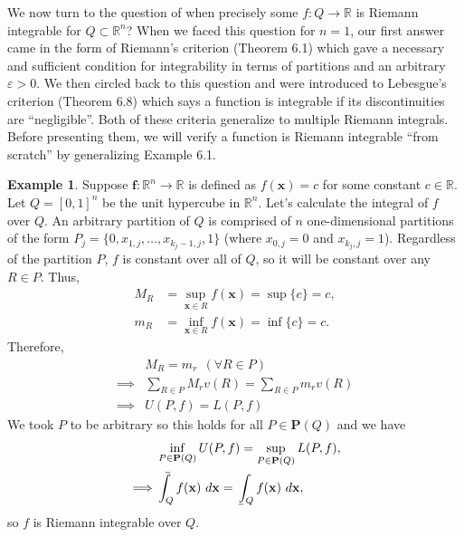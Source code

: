 \documentclass{article}
\def\upint{\mathchoice%
	{\mkern13mu\overline{\vphantom{\intop}\mkern7mu}\mkern-20mu}%
	{\mkern7mu\overline{\vphantom{\intop}\mkern7mu}\mkern-14mu}%
	{\mkern7mu\overline{\vphantom{\intop}\mkern7mu}\mkern-14mu}%
	{\mkern7mu\overline{\vphantom{\intop}\mkern7mu}\mkern-14mu}%
	\int}
\def\lowint{\mkern3mu\underline{\vphantom{\intop}\mkern7mu}\mkern-10mu\int}
\newcommand{\R}{\mathbb{R}}
\newcommand{\x}{\mathbf{x}}
\newcommand{\f}{\mathbf{f}}
\theoremstyle{definition}
\newtheorem{example}{Example}[section]
\begin{document}
We now turn to the question of when precisely some $ f:Q\to\R $ is Riemann integrable for $  Q\subset \R^n $? When we faced this question for $ n = 1 $, our first answer came in the form of Riemann's criterion (Theorem 6.1) which gave a necessary and sufficient condition for integrability in terms of partitions and an arbitrary $ \varepsilon>0 $. We then circled back to this question and were introduced to Lebesgue's criterion (Theorem 6.8) which says a function is integrable if its discontinuities are ``negligible''. Both of these criteria generalize to multiple Riemann integrals. Before presenting them, we will verify a function is Riemann integrable ``from scratch'' by generalizing Example 6.1.
\begin{example}
	Suppose $ \f:\R^n\to\R $ is defined as $ f(\x) = c $ for some constant $ c\in \R $. Let $ Q = [0,1]^n $ be the unit hypercube in $ \R^n $. Let's calculate the integral of  $ f $ over $ Q $. An arbitrary partition of $ Q $ is comprised of $ n $ one-dimensional partitions of the form $ P_j =\{0,x_{1,j},\ldots, x_{k_j-1,j},1\} $ (where $ x_{0,j}=0 $ and $ x_{k_j,j}=1 $). Regardless of the partition $ P $, $ f $ is constant over all of $ Q $, so it will be constant over any $ R\in P $. Thus, 
	\begin{align*}
		M_R &= \sup_{\x\in R}f(\x) = \sup \{c\} = c, \\
		m_R &= \inf_{\x\in R}f(\x) = \inf \{c\} = c .
	\end{align*} 
	Therefore, 
	\begin{align*}
		&M_R  = m_r\ \ (\forall R\in P)\\
		\implies & \sum_{R\in P} M_rv(R)  = \sum_{R\in P} m_rv(R) \\ \implies & U(P,f) = L(P,f) 
	\end{align*}
We took $ P $ to be arbitrary so this holds for all $ P\in \mathbf P(Q) $ and we have 
\begin{align*}
		&\inf_{P\in \textbf{P}(Q)} U(P,f)=\sup_{P\in \textbf{P}(Q)} L(P,f),\\
	\implies &\upint_Q f(\x)\ d\x = \lowint_Q f(\x)\ d\x, 
\end{align*}
so $ f $ is Riemann integrable over $ Q $.


\end{example}
\end{document}
